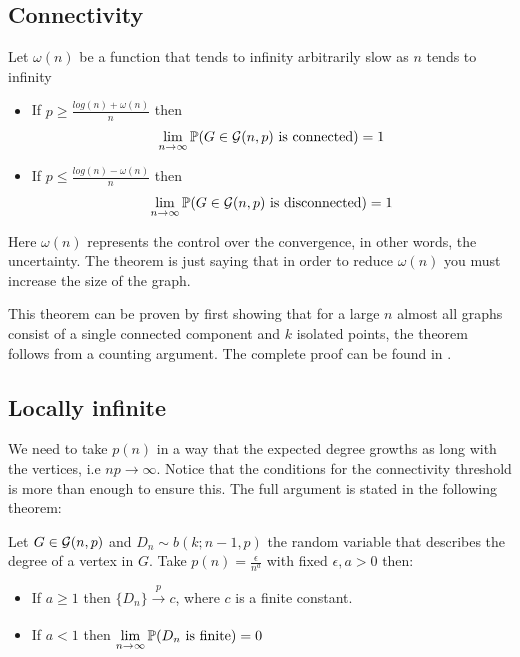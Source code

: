 \subsection{Connectivity}
\begin{theorem}
Let $\omega(n)$ be a function that tends to infinity arbitrarily slow as $n$ tends to infinity
\begin{itemize}
\item If $p\geq \frac{log(n)+ \omega(n)}{n}$ then 
$$\lim_{n \to \infty} \P(G \in \G(n,p) \text{ is connected}) = 1$$
\item If $p\leq \frac{log(n)- \omega(n)}{n}$ then
$$\lim_{n \to \infty} \P(G \in \G(n,p) \text{ is disconnected}) = 1$$
\end{itemize}
\end{theorem}

Here $\omega(n)$ represents the control over the convergence, in other words, the uncertainty. The theorem is just saying that in order to reduce $\omega(n)$ you must increase the size of the graph.

This theorem can be proven by first showing that for a large $n$ almost all graphs consist of a single connected component and $k$ isolated points, the theorem follows from a counting argument. The complete proof can be found in \cite[Erdös-Rényi, p.~59]{Erdos59}.
 
\subsection{Locally infinite}

We need to take $p(n)$ in a way that the expected degree growths as long with the vertices, i.e $n p\to \infty$. Notice that the conditions for the connectivity threshold is more than enough to ensure this. The full argument is stated in the following theorem:

\begin{theorem}\label{conectivityRCC}
Let $G \in \G(n,p)$ and $D_{n} \sim b(k; n-1,p)$ the random variable that describes the degree of a vertex in $G$. Take $p(n)=\frac{\epsilon}{n^{a}}$ with fixed $\epsilon,a >0$ then:
\begin{itemize}
    \item If $a\geq 1$ then $\{D_{n}\} \xrightarrow[]{p} c $, where $c$ is a finite constant.
    \item If $a<1$ then $\lim\limits_{n \to \infty} \P(D_n \text{ is finite}) = 0$
\end{itemize}
\end{theorem}

